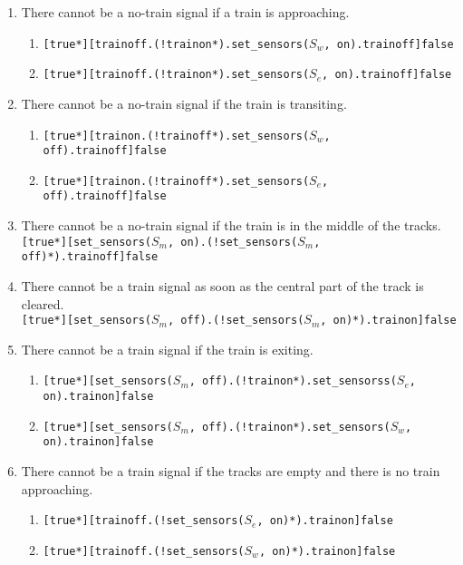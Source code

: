 \documentclass[final]{report}
\begin{document}
\begin{enumerate}
\item There cannot be a no-train signal if a train is approaching.
	\begin{enumerate}[label=\roman*]
		\item \texttt{[true*][trainoff.(!trainon*).set\_sensors($S_{w}$, on).trainoff]false}
		\item \texttt{[true*][trainoff.(!trainon*).set\_sensors($S_{e}$, on).trainoff]false} 
	\end{enumerate}

\item There cannot be a no-train signal if the train is transiting.
	\begin{enumerate}[label=\roman*]
		\item \texttt{[true*][trainon.(!trainoff*).set\_sensors($S_{w}$, off).trainoff]false}
		\item \texttt{[true*][trainon.(!trainoff*).set\_sensors($S_{e}$, off).trainoff]false}
	\end{enumerate}

\item There cannot be a no-train signal if the train is in the middle of the tracks.\\
	\texttt{[true*][set\_sensors($S_{m}$, on).(!set\_sensors($S_{m}$, off)*).trainoff]false}

\item There cannot be a train signal as soon as the central part of the track is cleared.\\
	\texttt{[true*][set\_sensors($S_{m}$, off).(!set\_sensors($S_{m}$, on)*).trainon]false}

\item There cannot be a train signal if the train is exiting.
	\begin{enumerate}[label=\roman*]
		\item \texttt{[true*][set\_sensors($S_{m}$, off).(!trainon*).set\_sensorss($S_{e}$, on).trainon]false}
		\item \texttt{[true*][set\_sensors($S_{m}$, off).(!trainon*).set\_sensors($S_{w}$, on).trainon]false}
	\end{enumerate}

\item There cannot be a train signal if the tracks are empty and there is no train approaching.
	\begin{enumerate}[label=\roman*]
		\item \texttt{[true*][trainoff.(!set\_sensors($S_{e}$, on)*).trainon]false}
		\item \texttt{[true*][trainoff.(!set\_sensors($S_{w}$, on)*).trainon]false}
	\end{enumerate}

\end{enumerate}
\end{document}
